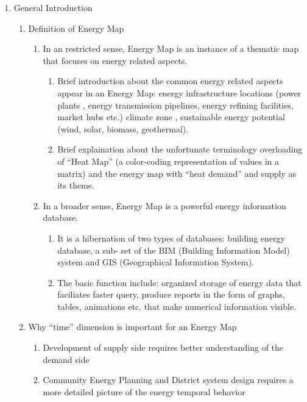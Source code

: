 \documentclass[12pt]{article}
\begin{document}
\begin{enumerate}
\item General Introduction
  \begin{enumerate}[label*=\arabic*.]
  \item Definition of Energy Map
    \begin{enumerate}[label*=\arabic*.]
    \item In an restricted sense, Energy Map is an instance of a
      thematic map that focuses on energy related aspects. 
        \begin{enumerate}[label*=\arabic*.]
        \item Brief introduction about the common energy related aspects
        appear in an Energy Map: energy infrastructure locations (power plants
        , energy transmission pipelines, energy refining facilities,
        market hubs etc.) climate zone , sustainable energy potential
        (wind, solar, biomass, geothermal).
        \item Brief explaination about the unfortunate terminology
        overloading of ``Heat Map'' (a color-coding representation of
        values in a matrix) and the energy map with ``heat demand'' and
        supply as its theme.
        \end{enumerate}
    \item In a broader sense, Energy Map is a powerful energy
        information database. 
        \begin{enumerate}[label*=\arabic*.]
        \item It is a hibernation of two types of databases: building
        energy database, a sub- set of the BIM (Building Information
        Model) system and GIS (Geographical Information System).
        \item The basic function include: organized storage of energy data that
        faciliates faster query, produce reports in the form of graphs,
        tables, animations etc. that make numerical information visible.
        \end{enumerate}
    \end{enumerate}
  \item Why ``time'' dimension is important for an Energy Map
    \begin{enumerate}[label*=\arabic*.]
    \item Development of supply side requires better understanding of
      the demand side
    \item Community Energy Planning and District system design
      requires a more detailed picture of the energy temporal behavior

\end{enumerate}
\end{enumerate}
\end{enumerate}
\end{document}
